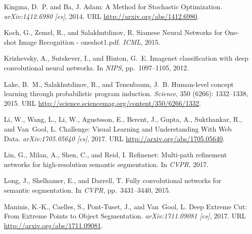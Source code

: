 \documentclass{article}
\begin{document}
\begin{thebibliography}{42}
Kingma, D.~P. and Ba, J.
\newblock Adam: {A} {Method} for {Stochastic} {Optimization}.
\newblock \emph{arXiv:1412.6980 [cs]}, 2014.
\newblock URL \url{http://arxiv.org/abs/1412.6980}.

Koch, G., Zemel, R., and Salakhutdinov, R.
\newblock Siamese {Neural} {Networks} for {One}-shot {Image} {Recognition} -
  oneshot1.pdf.
\newblock \emph{ICML}, 2015.

Krizhevsky, A., Sutskever, I., and Hinton, G.~E.
\newblock Imagenet classification with deep convolutional neural networks.
\newblock In \emph{NIPS}, pp.\  1097--1105, 2012.

Lake, B.~M., Salakhutdinov, R., and Tenenbaum, J.~B.
\newblock Human-level concept learning through probabilistic program induction.
\newblock \emph{Science}, 350 (6266): 1332--1338, 2015.
\newblock URL \url{http://science.sciencemag.org/content/350/6266/1332}.

Li, W., Wang, L., Li, W., Agustsson, E., Berent, J., Gupta, A., Sukthankar, R.,
  and Van~Gool, L.
 {Challenge}: {Visual} {Learning} and {Understanding}
  {With} {Web} {Data}.
\newblock \emph{arXiv:1705.05640 [cs]}, 2017.
\newblock URL \url{http://arxiv.org/abs/1705.05640}.

Lin, G., Milan, A., Shen, C., and Reid, I.
\newblock Refinenet: {Multi}-path refinement networks for high-resolution
  semantic segmentation.
\newblock In \emph{{CVPR}}, 2017.

Long, J., Shelhamer, E., and Darrell, T.
\newblock Fully convolutional networks for semantic segmentation.
\newblock In \emph{{CVPR}}, pp.\  3431--3440, 2015.

Maninis, K.-K., Caelles, S., Pont-Tuset, J., and Van~Gool, L.
\newblock Deep {Extreme} {Cut}: {From} {Extreme} {Points} to {Object}
  {Segmentation}.
\newblock \emph{arXiv:1711.09081 [cs]}, 2017.
\newblock URL \url{http://arxiv.org/abs/1711.09081}.


\end{thebibliography}
\end{document}
